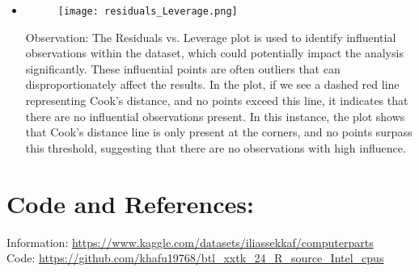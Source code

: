 \documentclass{article}
\begin{document}
\begin{itemize}
		\item 
		\begin{figure}[h]
			\centering
			\texttt{[image: residuals\_Leverage.png]}
		\end{figure}
		Observation: The Residuals vs. Leverage plot is used to identify influential observations within the dataset, which could potentially impact the analysis significantly. These influential points are often outliers that can disproportionately affect the results. In the plot, if we see a dashed red line representing Cook’s distance, and no points exceed this line, it indicates that there are no influential observations present. In this instance, the plot shows that Cook’s distance line is only present at the corners, and no points surpass this threshold, suggesting that there are no observations with high influence.
		
		
	\end{itemize}
	\section{Code and References:}
	Information: \url{https://www.kaggle.com/datasets/iliassekkaf/computerparts}\\
	Code: \url{https://github.com/khafu19768/btl_xxtk_24_R_source_Intel_cpus}
	
	
	
\end{document}
